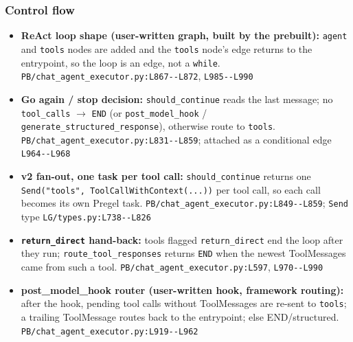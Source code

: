 \subsubsection*{Control flow}
\begin{itemize}
\item \textbf{ReAct loop shape (user-written graph, built by the prebuilt):} \texttt{agent} and \texttt{tools} nodes are added and the \texttt{tools} node's edge returns to the entrypoint, so the loop is an edge, not a \texttt{while}. \texttt{PB/\allowbreak{}chat\_\allowbreak{}agent\_\allowbreak{}executor.\allowbreak{}py:\allowbreak{}L867-\allowbreak{}-\allowbreak{}L872}, \texttt{L985-\allowbreak{}-\allowbreak{}L990}
\item \textbf{Go again / stop decision:} \texttt{should\_\allowbreak{}continue} reads the last message; no \texttt{tool\_\allowbreak{}calls} $\rightarrow$ \texttt{END} (or \texttt{post\_\allowbreak{}model\_\allowbreak{}hook} / \texttt{generate\_\allowbreak{}structured\_\allowbreak{}response}), otherwise route to \texttt{tools}. \texttt{PB/\allowbreak{}chat\_\allowbreak{}agent\_\allowbreak{}executor.\allowbreak{}py:\allowbreak{}L831-\allowbreak{}-\allowbreak{}L859}; attached as a conditional edge \texttt{L964-\allowbreak{}-\allowbreak{}L968}
\item \textbf{v2 fan-out, one task per tool call:} \texttt{should\_\allowbreak{}continue} returns one \texttt{Send(\allowbreak{}"tools", ToolCallWithContext(\allowbreak{}.\allowbreak{}.\allowbreak{}.\allowbreak{}))} per tool call, so each call becomes its own Pregel task. \texttt{PB/\allowbreak{}chat\_\allowbreak{}agent\_\allowbreak{}executor.\allowbreak{}py:\allowbreak{}L849-\allowbreak{}-\allowbreak{}L859}; \texttt{Send} type \texttt{LG/\allowbreak{}types.\allowbreak{}py:\allowbreak{}L738-\allowbreak{}-\allowbreak{}L826}
\item \textbf{\texttt{return\_\allowbreak{}direct} hand-back:} tools flagged \texttt{return\_\allowbreak{}direct} end the loop after they run; \texttt{route\_\allowbreak{}tool\_\allowbreak{}responses} returns \texttt{END} when the newest ToolMessages came from such a tool. \texttt{PB/\allowbreak{}chat\_\allowbreak{}agent\_\allowbreak{}executor.\allowbreak{}py:\allowbreak{}L597}, \texttt{L970-\allowbreak{}-\allowbreak{}L990}
\item \textbf{post\_model\_hook router (user-written hook, framework routing):} after the hook, pending tool calls without ToolMessages are re-sent to \texttt{tools}; a trailing ToolMessage routes back to the entrypoint; else END/structured. \texttt{PB/\allowbreak{}chat\_\allowbreak{}agent\_\allowbreak{}executor.\allowbreak{}py:\allowbreak{}L919-\allowbreak{}-\allowbreak{}L962}

\end{itemize}
